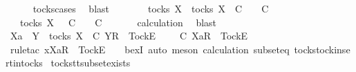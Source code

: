 \ \ \ \ \isamarkupfalse%
\ tocks{\isachardot}cases\ \isamarkupfalse%
\ blast\isanewline
\ \ \isamarkupfalse%
\ \isamarkupfalse%
\ {\isachardoublequoteopen}{\isasymsigma}{\isacharprime}\ {\isasymin}\ tocks\ X\ {\isasymLongrightarrow}\ {\isasymexists}{\isasymrho}{\isacharprime}{\isasymin}tocks\ X{\isachardot}\ {\isasymrho}{\isacharprime}\ {\isasymsubseteq}\isactrlsub C\ {\isasymsigma}{\isacharprime}\ {\isasymand}\ {\isasymrho}{\isacharprime}\ {\isasymle}\isactrlsub C\ {\isasymrho}{\isachardoublequoteclose}\isanewline
\ \ \isamarkupfalse%
\ \isamarkupfalse%
\ {\isasymrho}{\isacharprime}\ \ {\isachardoublequoteopen}{\isasymrho}{\isacharprime}{\isasymin}tocks\ X\ {\isasymand}\ {\isasymrho}{\isacharprime}\ {\isasymsubseteq}\isactrlsub C\ {\isasymsigma}{\isacharprime}\ {\isasymand}\ {\isasymrho}{\isacharprime}\ {\isasymle}\isactrlsub C\ {\isasymrho}{\isachardoublequoteclose}\isanewline
\ \ \ \ \isamarkupfalse%
\ calculation\ \isamarkupfalse%
\ blast\isanewline
\ \ \isamarkupfalse%
\ \isamarkupfalse%
\ {\isachardoublequoteopen}Xa\ {\isasymsubseteq}\ Y\ {\isasymLongrightarrow}\ {\isasymexists}{\isasymrho}{\isacharprime}{\isasymin}tocks\ X{\isachardot}\ {\isasymrho}{\isacharprime}\ {\isasymsubseteq}\isactrlsub C\ {\isacharbrackleft}Y{\isacharbrackright}\isactrlsub R\ {\isacharhash}\ {\isacharbrackleft}Tock{\isacharbrackright}\isactrlsub E\ {\isacharhash}\ {\isasymsigma}{\isacharprime}\ {\isasymand}\ {\isasymrho}{\isacharprime}\ {\isasymle}\isactrlsub C\ {\isacharbrackleft}Xa{\isacharbrackright}\isactrlsub R\ {\isacharhash}\ {\isacharbrackleft}Tock{\isacharbrackright}\isactrlsub E\ {\isacharhash}\ {\isasymrho}{\isachardoublequoteclose}\isanewline
\ \ \ \ \isamarkupfalse%
\ {\isacharparenleft}rule{\isacharunderscore}tac\ x{\isacharequal}{\isachardoublequoteopen}{\isacharbrackleft}Xa{\isacharbrackright}\isactrlsub R\ {\isacharhash}\ {\isacharbrackleft}Tock{\isacharbrackright}\isactrlsub E\ {\isacharhash}\ {\isasymrho}{\isacharprime}{\isachardoublequoteclose}\ \ bexI{\isacharcomma}\ auto{\isacharcomma}\ meson\ calculation\ subset{\isacharunderscore}eq\ tocks{\isachardot}tock{\isacharunderscore}insert{\isacharunderscore}in{\isacharunderscore}tocks{\isacharparenright}\isanewline
{}\isamarkupfalse%
%
\endisatagproof
{\isafoldproof}%
%
\isadelimproof
\isanewline
%
\endisadelimproof
\isanewline
{}\isamarkupfalse%
\ tocks{\isacharunderscore}tt{\isacharunderscore}subset{\isacharunderscore}exists{}{\isacharcolon}\isanewline
